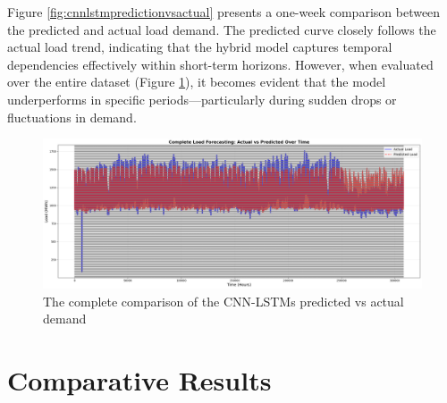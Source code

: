 Figure \ref{fig:cnnlstmpredictionvsactual} presents a one-week comparison between the predicted and actual load demand. The predicted curve closely follows the actual load trend, indicating that the hybrid model captures temporal dependencies effectively within short-term horizons. However, when evaluated over the entire dataset (Figure \ref{fig:cnnlstmpredictionvsactualfull}), it becomes evident that the model underperforms in specific periods—particularly during sudden drops or fluctuations in demand.
 \begin{figure}[h]
 	\centering
 	\includegraphics[width=0.9\linewidth,height=0.3\textwidth]{Chapters/images/results/cnn_lstm_prediction_vs_actual_full}
 	\caption{The complete comparison of the CNN-LSTMs predicted vs actual demand}
 	\label{fig:cnnlstmpredictionvsactualfull}
 \end{figure}
 
 
 \section{Comparative Results}
 
